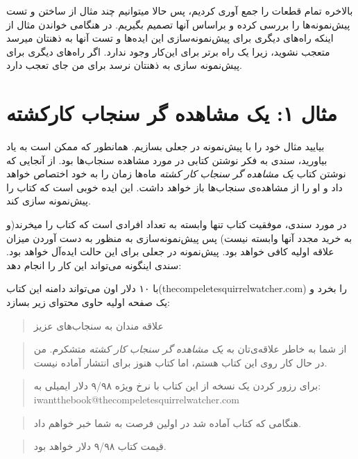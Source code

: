 بالاخره تمام قطعات را جمع آوری کردیم، پس حالا میتوانیم چند مثال از ساختن
و تست پیش‌نمونه‌ها را بررسی کرده و براساس آنها تصمیم بگیریم. در هنگامی
خواندن مثال از اینکه راه‌های دیگری برای پیش‌نمونه‌سازی این ایده‌ها و تست
آنها به ذهنتان میرسد متعجب نشوید، زیرا یک راه برتر برای این‌کار وجود
ندارد. اگر راه‌های دیگری برای پیش‌نمونه سازی به ذهنتان نرسد برای من جای
تعجب دارد.

\section{مثال ۱: یک مشاهده گر سنجاب
کارکشته}\label{ux645ux62bux627ux644-ux6ccux6a9-ux645ux634ux627ux647ux62fux647-ux6afux631-ux633ux646ux62cux627ux628-ux6a9ux627ux631ux6a9ux634ux62aux647}

بیایید مثال خود را با پیش‌نمونه در جعلی بسازیم. همانطور که ممکن است به
یاد بیاورید، سندی به فکر نوشتن کتابی در مورد مشاهده سنجاب‌ها بود. از
آنجایی که نوشتن کتاب \emph{یک مشاهده گر سنجاب کار کشته} ماه‌ها زمان را
به خود اختصاص خواهد داد و او را از مشاهده‌ی سنجاب‌ها باز خواهد داشت. این
ایده خوبی است که کتاب را پیش‌نمونه سازی کند.

در مورد سندی، موفقیت کتاب تنها وابسته به تعداد افرادی است که کتاب را
میخرند(و به خرید مجدد آنها وابسته نیست) پس پیش‌نمونه‌سازی به منظور به
دست آوردن میزان علاقه اولیه کافی خواهد بود. پیش‌نمونه در جعلی برای این
حالت ایده‌آل خواهد بود. سندی اینگونه می‌تواند این کار را انجام دهد:

با ۱۰ دلار اون می‌تواند دامنه این کتاب(thecompeletesquirrelwatcher.com)
را بخرد و یک صفحه اولیه حاوی محتوای زیر بسازد:

\begin{quote}
علاقه مندان به سنجاب‌های عزیز
\end{quote}

\begin{quote}
از شما به خاطر علاقه‌ی‌تان به \emph{یک مشاهده گر سنجاب کار کشته} متشکرم.
من در حال کار روی این کتاب هستم، اما کتاب هنوز برای انتشار آماده نیست.
\end{quote}

\begin{quote}
برای رزور کردن یک نسخه از این کتاب با نرخ ویژه ۹/۹۸ دلار ایمیلی به:
iwantthebook@thecompeletesquirrelwatcher.com
\end{quote}

\begin{quote}
هنگامی که کتاب آماده شد در اولین فرصت به شما خبر خواهم داد.
\end{quote}

\begin{quote}
قیمت کتاب ۹/۹۸ دلار خواهد بود.
\end{quote}

